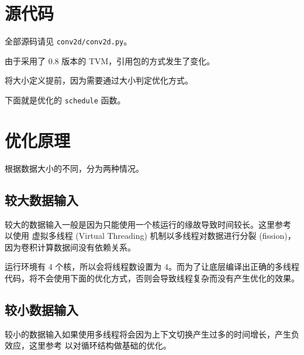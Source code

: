 \documentclass[UTF8]{ctexart}
\begin{document}

\section{源代码}

全部源码请见 \verb"conv2d/conv2d.py"。


由于采用了 0.8 版本的 TVM，引用包的方式发生了变化。



将大小定义提前，因为需要通过大小判定优化方式。



下面就是优化的 \verb"schedule" 函数。



\section{优化原理}

根据数据大小的不同，分为两种情况。

\subsection{较大数据输入}

较大的数据输入一般是因为只能使用一个核运行的缘故导致时间较长。这里参考 \cite{vta} 以使用 虚拟多线程 (Virtual Threading) 机制以多线程对数据进行分裂 (fission)，因为卷积计算数据间没有依赖关系。

运行环境有 4 个核，所以会将线程数设置为 4。而为了让底层编译出正确的多线程代码，将不会使用下面的优化方式，否则会导致线程复杂而没有产生优化的效果。

\subsection{较小数据输入}

较小的数据输入如果使用多线程将会因为上下文切换产生过多的时间增长，产生负效应，这里参考 \cite{cpu} 以对循环结构做基础的优化。
\end{document}
